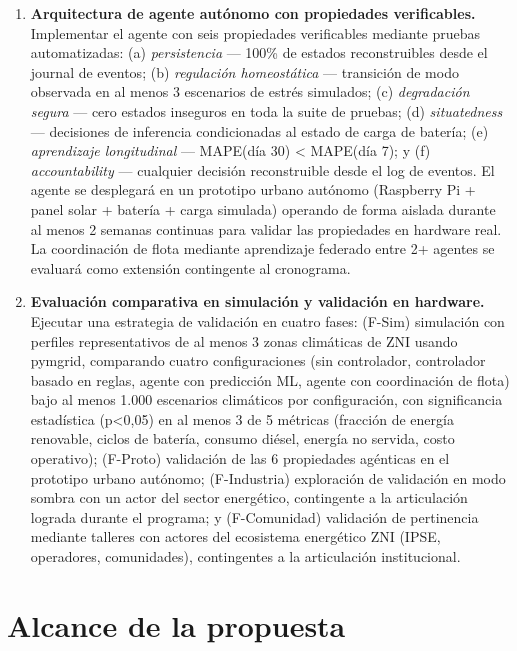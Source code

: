 \documentclass[12pt,letterpaper]{article}
\begin{document}
\begin{enumerate}[start=0]
\item \textbf{Arquitectura de agente aut\'onomo con propiedades verificables.} Implementar el agente con seis propiedades verificables mediante pruebas automatizadas: (a) \textit{persistencia} --- 100\% de estados reconstruibles desde el journal de eventos; (b) \textit{regulaci\'on homeost\'atica} --- transici\'on de modo observada en al menos 3 escenarios de estr\'es simulados; (c) \textit{degradaci\'on segura} --- cero estados inseguros en toda la suite de pruebas; (d) \textit{situatedness} --- decisiones de inferencia condicionadas al estado de carga de bater\'ia; (e) \textit{aprendizaje longitudinal} --- MAPE(d\'ia 30) < MAPE(d\'ia 7); y (f) \textit{accountability} --- cualquier decisi\'on reconstruible desde el log de eventos. El agente se desplegar\'a en un prototipo urbano aut\'onomo (Raspberry Pi + panel solar + bater\'ia + carga simulada) operando de forma aislada durante al menos 2 semanas continuas para validar las propiedades en hardware real. La coordinaci\'on de flota mediante aprendizaje federado entre 2+ agentes se evaluar\'a como extensi\'on contingente al cronograma.

\item \textbf{Evaluaci\'on comparativa en simulaci\'on y validaci\'on en hardware.} Ejecutar una estrategia de validaci\'on en cuatro fases: (F-Sim) simulaci\'on con perfiles representativos de al menos 3 zonas clim\'aticas de ZNI usando pymgrid, comparando cuatro configuraciones (sin controlador, controlador basado en reglas, agente con predicci\'on ML, agente con coordinaci\'on de flota) bajo al menos 1.000 escenarios clim\'aticos por configuraci\'on, con significancia estad\'istica (p<0,05) en al menos 3 de 5 m\'etricas (fracci\'on de energ\'ia renovable, ciclos de bater\'ia, consumo di\'esel, energ\'ia no servida, costo operativo); (F-Proto) validaci\'on de las 6 propiedades ag\'enticas en el prototipo urbano aut\'onomo; (F-Industria) exploraci\'on de validaci\'on en modo sombra con un actor del sector energ\'etico, contingente a la articulaci\'on lograda durante el programa; y (F-Comunidad) validaci\'on de pertinencia mediante talleres con actores del ecosistema energ\'etico ZNI (IPSE, operadores, comunidades), contingentes a la articulaci\'on institucional.
\end{enumerate}

\section{Alcance de la propuesta}
\end{document}
